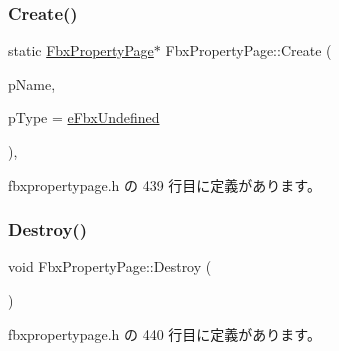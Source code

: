 \mbox{\label{class_fbx_property_page_af9d499eed8ef1bf4ad130d5d2e05ff8f}} 
\subsubsection{\texorpdfstring{Create()}{Create()}\hspace{0.1cm}{\footnotesize\ttfamily [3/3]}}
{\footnotesize\ttfamily static \hyperlink{class_fbx_property_page}{Fbx\+Property\+Page}$\ast$ Fbx\+Property\+Page\+::\+Create (\begin{DoxyParamCaption}\item[{const char $\ast$}]{p\+Name,  }\item[{\hyperlink{fbxpropertytypes_8h_a73913a5ddfb20e57c6f25e9e6784bd92}{E\+Fbx\+Type}}]{p\+Type = {\ttfamily \hyperlink{fbxpropertytypes_8h_a73913a5ddfb20e57c6f25e9e6784bd92a150b400dddd0f8b5c7e22a1bba0721d8}{e\+Fbx\+Undefined}} }\end{DoxyParamCaption})\hspace{0.3cm}{\ttfamily [inline]}, {\ttfamily [static]}}



 fbxpropertypage.\+h の 439 行目に定義があります。

\mbox{\label{class_fbx_property_page_a4c1d17d6237f93017d6171c575d59c7c}} 
\subsubsection{\texorpdfstring{Destroy()}{Destroy()}}
{\footnotesize\ttfamily void Fbx\+Property\+Page\+::\+Destroy (\begin{DoxyParamCaption}{ }\end{DoxyParamCaption})\hspace{0.3cm}{\ttfamily [inline]}}



 fbxpropertypage.\+h の 440 行目に定義があります。

\mbox{\label{class_fbx_property_page_a1954d1f34ba38a2a4bbc208650206e22}} 
